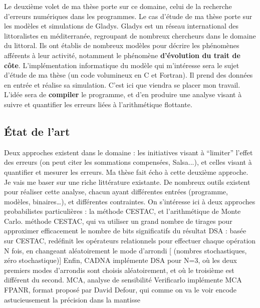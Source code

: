 \documentclass[a4paper,11pt]{article}
\begin{document}
Le deuxième volet de ma thèse porte sur ce domaine, celui de la recherche d'erreurs numériques dans les programmes.
Le cas d’étude de ma thèse porte sur les modèles et simulations de Gladys.
Gladys est un réseau international des littoralistes en méditerranée, regroupant de nombreux chercheurs dans le domaine du littoral.
Ils ont établis de nombreux modèles pour décrire les phénomènes afférents à leur activité, notamment le phénomène \textbf{d’évolution du trait de côte}.
L’implémentation informatique du modèle qui m’intéresse sera le sujet d’étude de ma thèse (un code volumineux en C et Fortran). Il prend des données en entrée et réalise sa simulation. C'est ici que viendra se placer mon travail. L’idée sera de \textbf{compiler} le programme, et d’en produire une analyse visant à suivre et quantifier les erreurs liées à l’arithmétique flottante.


\subsection{ État de l’art }

Deux approches existent dans le domaine : les initiatives visant à “limiter” l’effet des erreurs (on peut citer les sommations compensées, Salsa...), et celles visant à quantifier et mesurer les erreurs.
Ma thèse fait écho à cette deuxième approche.
Je vais me baser sur une riche littérature existante.
De nombreux outils existent pour réaliser cette analyse, chacun ayant différentes entrées (programme, modèles, binaires…), et différentes contraintes.
On s’intéresse ici à deux approches probabilistes particulières : la méthode CESTAC, et l’arithmétique de Monte Carlo.
méthode CESTAC, qui va utiliser un grand nombre de tirages pour approximer efficacement le nombre de bits significatifs du résultat
DSA : basée sur CESTAC, redéfinit les opérateurs relationnels pour effectuer chaque opération N fois, en changeant aléatoirement le mode d’arrondi [ (nombres stochastiques, zéro stochastique)] 
Enfin, CADNA implémente DSA pour N=3, où les deux premiers modes d’arrondis sont choisis aléatoirement, et où le troisième est différent du second.
MCA, analyse de sensibilité
Verificarlo implémente MCA
FPANR, format proposé par David Defour, qui comme on va le voir encode astucieusement la précision dans la mantisse
\end{document}
